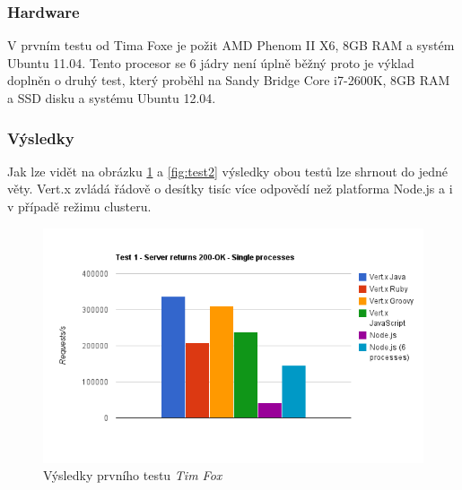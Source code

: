 \subsubsection{Hardware}

V prvním testu od Tima Foxe je požit  AMD Phenom II X6, 8GB RAM a systém Ubuntu 11.04. Tento procesor se 6 jádry není úplně běžný proto je výklad doplněn o druhý test, který proběhl na Sandy Bridge Core i7-2600K, 8GB RAM a SSD disku a systému Ubuntu 12.04.

\subsubsection{Výsledky}

Jak lze vidět na obrázku \ref{fig:test1} a \ref{fig:test2} výsledky obou testů lze shrnout do jedné věty. Vert.x zvládá řádově o desítky tisíc více odpovědí než platforma Node.js a i v případě režimu clusteru.

\begin{figure}
\begin{centering}
\includegraphics[scale=0.7]{obrazky/chart_1}
\par\end{centering}
\caption{Výsledky prvního testu \emph{Tim Fox} \cite{benchmarkTim}\label{fig:test1}}
\end{figure}

